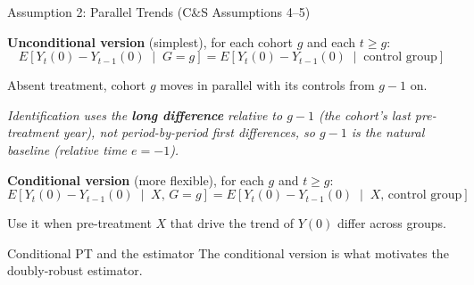 \documentclass[main.tex]{subfiles}
\begin{document}
\begin{frame}{Assumption 2: Parallel Trends (C\&S Assumptions 4--5)}

  \textbf{Unconditional version} (simplest), for each cohort $g$ and each $t \ge g$:
  \[
    E\!\left[Y_t(0) - Y_{t-1}(0)\;\middle|\;G=g\right]
    = E\!\left[Y_t(0) - Y_{t-1}(0)\;\middle|\;\text{control group}\right]
  \]

  Absent treatment, cohort $g$ moves in parallel with its controls from
  $g{-}1$ on.

  \smallskip
  \textit{Identification uses the \textbf{long difference} relative to
  $g{-}1$ (the cohort's last pre-treatment year), not period-by-period
  first differences, so $g{-}1$ is the natural baseline (relative
  time $e=-1$).}

  \medskip
  \textbf{Conditional version} (more flexible), for each $g$ and $t \ge g$:
  \[
    E\!\left[Y_t(0) - Y_{t-1}(0)\;\middle|\;X,\, G=g\right]
    = E\!\left[Y_t(0) - Y_{t-1}(0)\;\middle|\;X,\, \text{control group}\right]
  \]

  Use it when pre-treatment $X$ that drive the trend of $Y(0)$ differ
  across groups.

  \medskip
  \begin{alertblock}{Conditional PT and the estimator}
    The conditional version is what motivates the doubly-robust estimator.
  \end{alertblock}

\end{frame}
\end{document}
